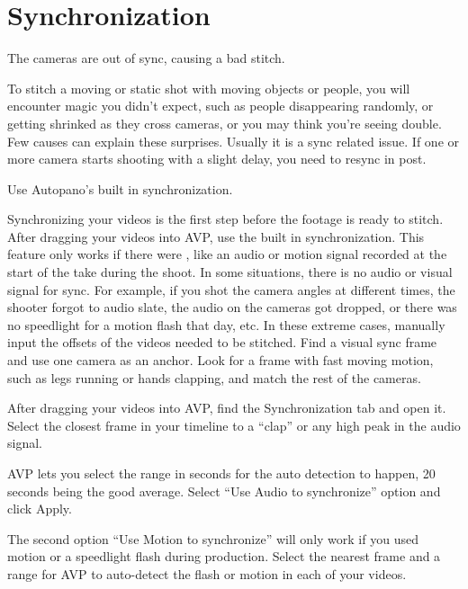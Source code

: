\section{Synchronization}
\pagecolor{white}
\label{chap:33}
\begin{fullwidth}

\problem

{\large The cameras are out of sync, causing a bad stitch. \par}

To stitch a moving or static shot with moving objects or people, you will encounter magic you didn’t expect, such as people disappearing randomly, or getting shrinked as they cross cameras, or you may think you’re seeing double. Few causes can explain these surprises. Usually it is a sync related issue. If one or more camera starts shooting with a slight delay, you need to resync in post.


\solutions

{\large Use Autopano’s built in synchronization. \par}

Synchronizing your videos is the first step before the footage is ready to stitch. After dragging your videos into AVP, use the built in synchronization. This feature only works if there were \textbf{}, like an audio or motion signal recorded at the start of the take during the shoot. In some situations, there is no audio or visual signal for sync. For example, if you shot the camera angles at different times, the shooter forgot to audio slate, the audio on the cameras got dropped, or there was no speedlight for a motion flash that day, etc. In these extreme cases, manually input the offsets of the videos needed to be stitched. Find a visual sync frame and use one camera as an anchor. Look for a frame with fast moving motion, such as legs running or hands clapping, and match the rest of the cameras.

After dragging your videos into AVP, find the Synchronization tab and open it. Select the closest frame in your timeline to a “clap” or any high peak in the audio signal. 

AVP lets you select the range in seconds for the auto detection to happen, 20 seconds being the good average. Select “Use Audio to synchronize” option and click Apply.


The second option “Use Motion to synchronize” will only work if you used motion or a speedlight flash during production. Select the nearest frame and a range for AVP to auto-detect the flash or motion in each of your videos.


\end{fullwidth}
